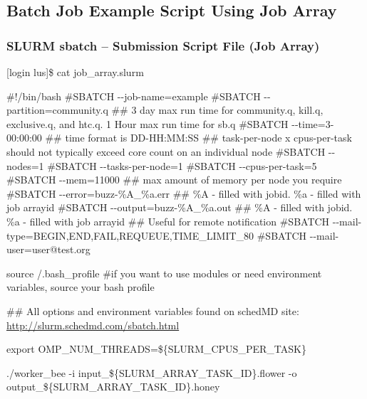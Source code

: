 \documentclass[t,hyperref={pdfpagelabels=false}]{beamer}
\newcommand{\ctilde}{{\fontfamily{ptm}\selectfont\texttildelow}}
\newcommand{\ddash}{-{}-}
\begin{document}
\subsection{Batch Job Example Script Using Job Array}
\begin{frame}[fragile]
\frametitle{SLURM sbatch -- Submission Script File (Job Array)}
\begin{semiverbatim}\tiny
[login lus]\$ cat job_array.slurm

\#!/bin/bash
\#SBATCH \ddash{}job-name=example
\#SBATCH \ddash{}partition=community.q
\#\# 3 day max run time for community.q, kill.q, exclusive.q, and htc.q.  1 Hour max run time for sb.q
\#SBATCH \ddash{}time=3-00:00:00 ## time format is DD-HH:MM:SS
\#\# task-per-node x cpus-per-task should not typically exceed core count on an individual node 
\#SBATCH \ddash{}nodes=1
\#SBATCH \ddash{}tasks-per-node=1
\#SBATCH \ddash{}cpus-per-task=5
\#SBATCH \ddash{}mem=11000 \#\# max amount of memory per node you require
\#SBATCH \ddash{}error=buzz-\%A\_\%a.err \#\# \%A - filled with jobid. \%a - filled with job arrayid
\#SBATCH \ddash{}output=buzz-\%A\_\%a.out \#\# \%A - filled with jobid. \%a - filled with job arrayid
\#\# Useful for remote notification
\#SBATCH \ddash{}mail-type=BEGIN,END,FAIL,REQUEUE,TIME\_LIMIT\_80
\#SBATCH \ddash{}mail-user=user@test.org

source \ctilde/.bash_profile \#if you want to use modules or need environment variables, source your bash profile

\#\# All options and environment variables found on schedMD site: \href{http://slurm.schedmd.com/sbatch.html}{http://slurm.schedmd.com/sbatch.html}

export OMP\_NUM\_THREADS=\$\{SLURM\_CPUS\_PER\_TASK\}

./worker\_bee -i input\_\$\{SLURM_ARRAY_TASK_ID\}.flower -o output\_\$\{SLURM_ARRAY_TASK_ID\}.honey
\end{semiverbatim}
\end{frame}
\end{document}
